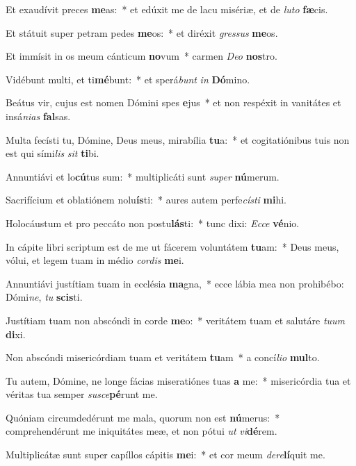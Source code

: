 \item Et exaudívit preces \textbf{me}as:~* et edúxit me de lacu misériæ, et de \textit{lu}\textit{to} \textbf{fæ}cis.
\item Et státuit super petram pedes \textbf{me}os:~* et diréxit \textit{gres}\textit{sus} \textbf{me}os.
\item Et immísit in os meum cánticum \textbf{no}vum~* carmen \textit{De}\textit{o} \textbf{nos}tro.
\item Vidébunt multi, et ti\textbf{mé}bunt:~* et sperá\textit{bunt} \textit{in} \textbf{Dó}mino.
\item Beátus vir, cujus est nomen Dómini spes \textbf{e}jus~* et non respéxit in vanitátes et insá\textit{ni}\textit{as} \textbf{fal}sas.
\item Multa fecísti tu, Dómine, Deus meus, mirabília \textbf{tu}a:~* et cogitatiónibus tuis non est qui sími\textit{lis} \textit{sit} \textbf{ti}bi.
\item Annuntiávi et lo\textbf{cú}tus sum:~* multiplicáti sunt \textit{su}\textit{per} \textbf{nú}merum.
\item Sacrifícium et oblatiónem nolu\textbf{ís}ti:~* aures autem perfe\textit{cís}\textit{ti} \textbf{mi}hi.
\item Holocáustum et pro peccáto non postu\textbf{lás}ti:~* tunc dixi: \textit{Ec}\textit{ce} \textbf{vé}nio.
\item In cápite libri scriptum est de me ut fácerem voluntátem \textbf{tu}am:~* Deus meus, vólui, et legem tuam in médio \textit{cor}\textit{dis} \textbf{me}i.
\item Annuntiávi justítiam tuam in ecclésia \textbf{ma}gna,~* ecce lábia mea non prohibébo: Dómi\textit{ne}, \textit{tu} \textbf{scis}ti.
\item Justítiam tuam non abscóndi in corde \textbf{me}o:~* veritátem tuam et salutáre \textit{tu}\textit{um} \textbf{di}xi.
\item Non abscóndi misericórdiam tuam et veritátem \textbf{tu}am~* a concí\textit{li}\textit{o} \textbf{mul}to.
\item Tu autem, Dómine, ne longe fácias miseratiónes tuas \textbf{a} me:~* misericórdia tua et véritas tua semper \textit{su}\textit{sce}\textbf{pé}runt me.
\item Quóniam circumdedérunt me mala, quorum non est \textbf{nú}merus:~* comprehendérunt me iniquitátes meæ, et non pótui \textit{ut} \textit{vi}\textbf{dé}rem.
\item Multiplicátæ sunt super capíllos cápitis \textbf{me}i:~* et cor meum \textit{de}\textit{re}\textbf{lí}quit me.
